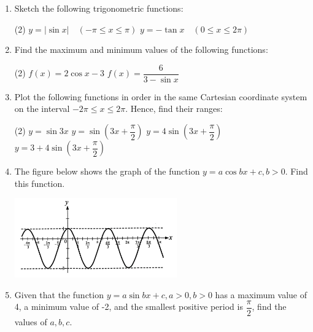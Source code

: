 \documentclass{report}
\begin{document}
        \newpage
        \begin{enumerate}
            \item Sketch the following trigonometric functions:
            \begin{tasks}[label=(\alph*)](2)
                \task \( y=|\sin x| \quad(-\pi \leq x \leq \pi) \)
                \task \( y=-\tan x \quad(0 \leq x \leq 2 \pi) \)
            \end{tasks}
            \item Find the maximum and minimum values of the following functions:
            \begin{tasks}[label=(\alph*)](2)
                \task \( f(x)=2 \cos x-3 \)
                \task \( f(x)=\dfrac{6}{3-\sin x} \)
            \end{tasks}
            \item  Plot the following functions in order in the same Cartesian coordinate system on the interval \( -2 \pi \leq x \leq 2 \pi \). Hence, find their ranges:
            \begin{tasks}[label=(\alph*)](2)
                \task \( y=\sin 3 x \)
                \task \( y=\sin \left(3 x+\dfrac{\pi}{2}\right) \)
                \task \( y=4 \sin \left(3 x+\dfrac{\pi}{2}\right) \)
                \task \( y=3+4 \sin \left(3 x+\dfrac{\pi}{2}\right) \)
            \end{tasks}
            \item The figure below shows the graph of the function \( y=a \cos b x+c, b>0 \). Find this function.
            \begin{center}
                \includegraphics[width=0.55\textwidth]{assets/9-33.jpg}
            \end{center}

            \item Given that the function \( y=a \sin b x+c, a>0, b>0 \) has a maximum value of 4, a minimum value of -2, and the smallest positive period is \( \dfrac{\pi}{2} \), find the values of \( a, b, c \).
            

\end{enumerate}
\end{document}
